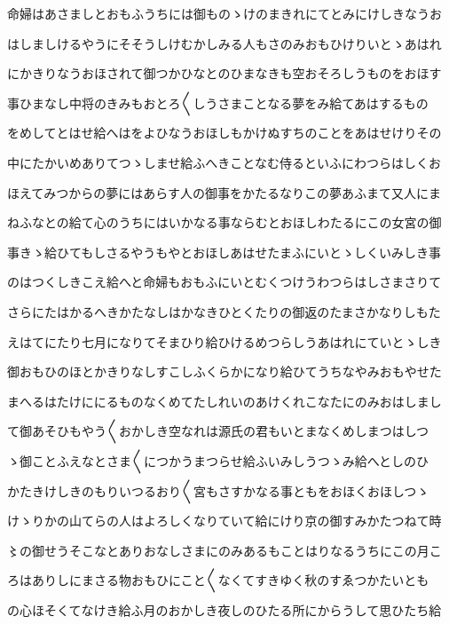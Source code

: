 \documentclass[a4paper,11pt,landscape]{ltjtarticle}
\begin{document}
\par\medskip
命婦はあさましとおもふうちには御ものゝけのまきれにてとみにけしきなうお
\par\medskip
はしましけるやうにそそうしけむかしみる人もさのみおもひけりいとゝあはれ
\par\medskip
にかきりなうおほされて御つかひなとのひまなきも空おそろしうものをおほす
\par\medskip
事ひまなし中将のきみもおとろ〱しうさまことなる夢をみ給てあはするもの
\par\medskip
をめしてとはせ給へはをよひなうおほしもかけぬすちのことをあはせけりその
\par\medskip
中にたかいめありてつゝしませ給ふへきことなむ侍るといふにわつらはしくお
\par\medskip
ほえてみつからの夢にはあらす人の御事をかたるなりこの夢あふまて又人にま
\par\medskip
ねふなとの給て心のうちにはいかなる事ならむとおほしわたるにこの女宮の御
\par\medskip
事きゝ給ひてもしさるやうもやとおほしあはせたまふにいとゝしくいみしき事
\par\medskip
のはつくしきこえ給へと命婦もおもふにいとむくつけうわつらはしさまさりて
\par\medskip
さらにたはかるへきかたなしはかなきひとくたりの御返のたまさかなりしもた
\par\medskip
えはてにたり七月になりてそまひり給ひけるめつらしうあはれにていとゝしき
\par\medskip
御おもひのほとかきりなしすこしふくらかになり給ひてうちなやみおもやせた
\par\medskip
まへるはたけににるものなくめてたしれいのあけくれこなたにのみおはしまし
\par\medskip
て御あそひもやう〱おかしき空なれは源氏の君もいとまなくめしまつはしつ
\par\medskip
ゝ御ことふえなとさま〱につかうまつらせ給ふいみしうつゝみ給へとしのひ
\par\medskip
かたきけしきのもりいつるおり〱宮もさすかなる事ともをおほくおほしつゝ
\par\medskip
けゝりかの山てらの人はよろしくなりていて給にけり京の御すみかたつねて時
\par\medskip
〻の御せうそこなとありおなしさまにのみあるもことはりなるうちにこの月こ
\par\medskip
ろはありしにまさる物おもひにこと〱なくてすきゆく秋のすゑつかたいとも
\par\medskip
の心ほそくてなけき給ふ月のおかしき夜しのひたる所にからうして思ひたち給
\par\medskip
\end{document}
